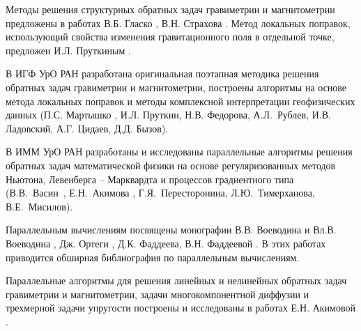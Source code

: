 {Методы решения структурных обратных задач гравиметрии и магнитометрии предложены в работах В.Б. Гласко \cite{GlaOstFil1970}, В.Н. Страхова \cite{Str1967,Str1969,Str1974_1,Str1974_2,Str1976}. Метод локальных поправок, использующий свойства изменения гравитационного поля в отдельной точке, предложен И.Л. Пруткиным \cite{Pru1983,Pru1986,Prutdiss1998}.

В ИГФ УрО РАН разработана оригинальная поэтапная методика решения обратных задач гравиметрии и магнитометрии, построены алгоритмы на основе метода локальных поправок и методы комплексной интерпретации геофизических данных (П.С. Мартышко \cite{MarPrut2003,MarLadTsi2010,MarLadByz2013,MarLadByz2013,MarRubFed2014,MarLadFedByzTsi2016},  И.Л. Пруткин, Н.В. Федорова, А.Л.~Рублев, И.В. Ладовский, А.Г. Цидаев, Д.Д. Бызов).

В ИММ УрО РАН разработаны и исследованы параллельные алгоритмы решения обратных задач математической физики на основе регуляризованных методов Ньютона, Левенберга -- Марквардта и процессов градиентного типа (В.В.~Васин~\cite{VasPerPruTim2003,VasPer_2011}, Е.Н.~Акимова \cite{AkiVas2002,Akidiss2009,AkiVas2004,AkMarMis2013}, Г.Я.~Пересторонина, Л.Ю.~Тимерханова, В.Е.~Мисилов).


Параллельным вычислениям посвящены монографии В.В. Воеводина и Вл.В. Воеводина \cite{VoeVoe2002}, Дж. Ортеги \cite{Ort1991}, Д.К. Фаддеева, В.Н. Фаддеевой \cite{FadFad1977}. В этих работах приводится обширная библиография по параллельным вычислениям.

Параллельные алгоритмы для решения линейных и нелинейных обратных задач 
гравиметрии и магнитометрии, задачи многокомпонентной диффузии и трехмерной задачи упругости построены и исследованы в работах Е.Н. Акимовой \cite{Aki1994,Aki2001,AkiGorPop2005,Aki2009,AkiBel2011,AkiMarMisKos2016,AkMisTre2017}.
}



